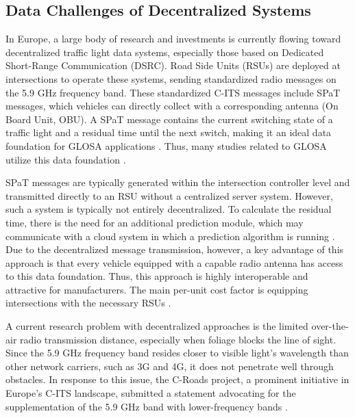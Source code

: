 \subsection{Data Challenges of Decentralized Systems}

In Europe, a large body of research and investments is currently flowing toward decentralized traffic light data systems, especially those based on Dedicated Short-Range Communication (DSRC). Road Side Units (RSUs) are deployed at intersections to operate these systems, sending standardized radio messages on the 5.9 GHz frequency band. These standardized C-ITS messages include SPaT messages, which vehicles can directly collect with a corresponding antenna (On Board Unit, OBU). A SPaT message contains the current switching state of a traffic light and a residual time until the next switch, making it an ideal data foundation for GLOSA applications \cite{ibrahim_estimating_2019, wagner_spatmap_2023}. Thus, many studies related to GLOSA utilize this data foundation \cite{schweiger_elisatm_2011, rakha_eco-driving_2011, rakha_aeris_2012, li_open_2012, suramardhana_driver-centric_2014, xu_bb_2015, bernais_design_2016, nguyen_efficient_2016, choudhury_integrated_2016, stahlmann_multi-hop_2017, stahlmann_exploring_2018, plianos_predictive_2018, zhang_green_2020, chen_developing_2022}.

SPaT messages are typically generated within the intersection controller level \cite{zweck_traffic_2013} and transmitted directly to an RSU without a centralized server system. However, such a system is typically not entirely decentralized. To calculate the residual time, there is the need for an additional prediction module, which may communicate with a cloud system in which a prediction algorithm is running \cite{strobl_c-its_2019, neuner_leitfaden_2020}. Due to the decentralized message transmission, however, a key advantage of this approach is that every vehicle equipped with a capable radio antenna has access to this data foundation. Thus, this approach is highly interoperable and attractive for manufacturers. The main per-unit cost factor is equipping intersections with the necessary RSUs \cite{niebel_cost-benefit-based_2013}.

A current research problem with decentralized approaches is the limited over-the-air radio transmission distance, especially when foliage blocks the line of sight. Since the 5.9 GHz frequency band resides closer to visible light's wavelength than other network carriers, such as 3G and 4G, it does not penetrate well through obstacles. In response to this issue, the C-Roads project, a prominent initiative in Europe's C-ITS landscape, submitted a statement advocating for the supplementation of the 5.9 GHz band with lower-frequency bands \cite{bohm_radio_2017}.

